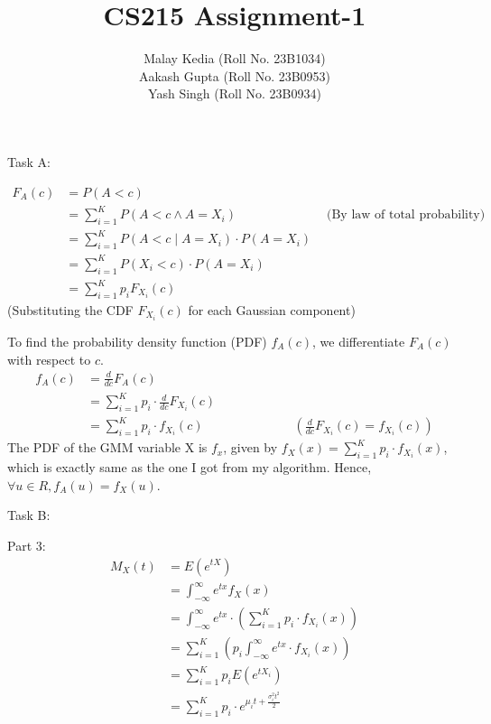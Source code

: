 \documentclass[a4paper,12pt,answers]{exam}
\title{CS215 Assignment-1}
\author{Malay Kedia (Roll No. 23B1034) \\ Aakash Gupta (Roll No. 23B0953) \\ Yash Singh (Roll No. 23B0934)}
\date{}
\begin{document}
\maketitle

\begin{questions}


Task A:
\begin{solution}
\begin{align*}
F_{A}(c)&=P(A<c)\\
&=\sum_{i=1}^{K} P(A < c \land A = X_i) \hspace{3cm} \text{(By law of total probability)}\\
&=\sum_{i=1}^{K} P(A < c \mid A = X_i) \cdot P(A = X_i)\\
&=\sum_{i=1}^{K} P(X_i < c) \cdot P(A = X_i)\\
&= \sum_{i=1}^{K} p_i F_{X_i}(c)
\end{align*}
(Substituting the CDF \( F_{X_i}(c) \) for each Gaussian component)

To find the probability density function (PDF) \( f_A(c) \), we differentiate \( F_A(c) \) with respect to \( c \).
\begin{align*}
f_A(c) &= \frac{d}{dc} F_A(c)\\
&= \sum_{i=1}^{K} p_i \cdot \frac{d}{dc} F_{X_i}(c)\\
&= \sum_{i=1}^{K} p_i \cdot f_{X_i}(c) \hspace{3cm} (\frac{d}{dc} F_{X_i}(c) = f_{X_i}(c))
\end{align*}
The PDF of the GMM variable X is $f_x$, given by $f_X(x)=\sum_{i=1}^{K} p_i \cdot f_{X_i}(x)$, which is exactly same as the one I got from my algorithm. Hence, $\forall u \in R, f_A(u)=f_X(u)$.
\end{solution}

Task B:
\begin{solution}
Part 3:\\
\begin{align*}
M_X(t)&=E(e^{tX})\\
&=\int_{-\infty}^{\infty} e^{tx} f_X(x)\\
&=\int_{-\infty}^{\infty} e^{tx}  \cdot (\sum_{i=1}^{K} p_i \cdot f_{X_i}(x))\\
&=\sum_{i=1}^{K} (p_i \int_{-\infty}^{\infty} e^{tx} \cdot f_{X_i}(x))\\
&=\sum_{i=1}^{K} p_i E(e^{t X_i})\\
&=\sum_{i=1}^{K} p_i \cdot e^{\mu_i t + \frac{\sigma_i^2 t^2}{2}}
\end{align*}


\end{solution}
\end{questions}
\end{document}
